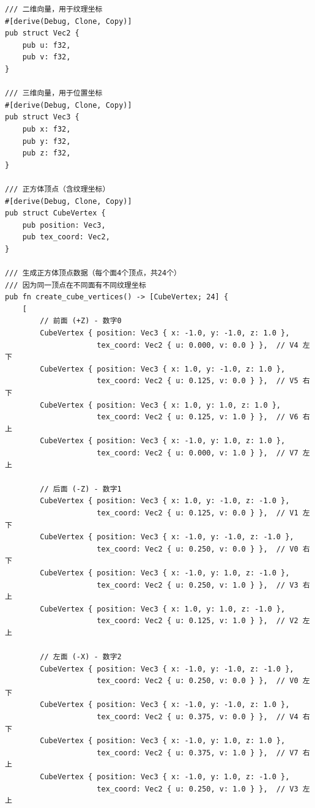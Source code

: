 \documentclass[12pt,a4paper]{article}
\begin{document}
\begin{lstlisting}[style=ruststyle, caption={正方体纹理坐标定义}]
/// 二维向量，用于纹理坐标
#[derive(Debug, Clone, Copy)]
pub struct Vec2 {
    pub u: f32,
    pub v: f32,
}

/// 三维向量，用于位置坐标
#[derive(Debug, Clone, Copy)]
pub struct Vec3 {
    pub x: f32,
    pub y: f32,
    pub z: f32,
}

/// 正方体顶点（含纹理坐标）
#[derive(Debug, Clone, Copy)]
pub struct CubeVertex {
    pub position: Vec3,
    pub tex_coord: Vec2,
}

/// 生成正方体顶点数据（每个面4个顶点，共24个）
/// 因为同一顶点在不同面有不同纹理坐标
pub fn create_cube_vertices() -> [CubeVertex; 24] {
    [
        // 前面 (+Z) - 数字0
        CubeVertex { position: Vec3 { x: -1.0, y: -1.0, z: 1.0 }, 
                     tex_coord: Vec2 { u: 0.000, v: 0.0 } },  // V4 左下
        CubeVertex { position: Vec3 { x: 1.0, y: -1.0, z: 1.0 }, 
                     tex_coord: Vec2 { u: 0.125, v: 0.0 } },  // V5 右下
        CubeVertex { position: Vec3 { x: 1.0, y: 1.0, z: 1.0 }, 
                     tex_coord: Vec2 { u: 0.125, v: 1.0 } },  // V6 右上
        CubeVertex { position: Vec3 { x: -1.0, y: 1.0, z: 1.0 }, 
                     tex_coord: Vec2 { u: 0.000, v: 1.0 } },  // V7 左上
        
        // 后面 (-Z) - 数字1
        CubeVertex { position: Vec3 { x: 1.0, y: -1.0, z: -1.0 }, 
                     tex_coord: Vec2 { u: 0.125, v: 0.0 } },  // V1 左下
        CubeVertex { position: Vec3 { x: -1.0, y: -1.0, z: -1.0 }, 
                     tex_coord: Vec2 { u: 0.250, v: 0.0 } },  // V0 右下
        CubeVertex { position: Vec3 { x: -1.0, y: 1.0, z: -1.0 }, 
                     tex_coord: Vec2 { u: 0.250, v: 1.0 } },  // V3 右上
        CubeVertex { position: Vec3 { x: 1.0, y: 1.0, z: -1.0 }, 
                     tex_coord: Vec2 { u: 0.125, v: 1.0 } },  // V2 左上
        
        // 左面 (-X) - 数字2
        CubeVertex { position: Vec3 { x: -1.0, y: -1.0, z: -1.0 }, 
                     tex_coord: Vec2 { u: 0.250, v: 0.0 } },  // V0 左下
        CubeVertex { position: Vec3 { x: -1.0, y: -1.0, z: 1.0 }, 
                     tex_coord: Vec2 { u: 0.375, v: 0.0 } },  // V4 右下
        CubeVertex { position: Vec3 { x: -1.0, y: 1.0, z: 1.0 }, 
                     tex_coord: Vec2 { u: 0.375, v: 1.0 } },  // V7 右上
        CubeVertex { position: Vec3 { x: -1.0, y: 1.0, z: -1.0 }, 
                     tex_coord: Vec2 { u: 0.250, v: 1.0 } },  // V3 左上
        

\end{lstlisting}
\end{document}
